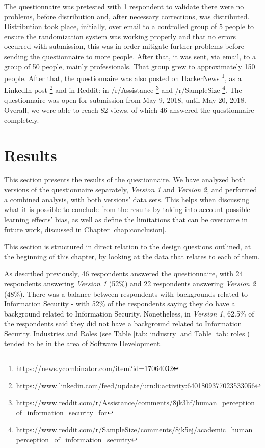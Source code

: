 The questionnaire was pretested with 1 respondent to validate there were no problems, before distribution and, after necessary corrections, was distributed. Distribution took place, initially, over email to a controlled group of 5 people to ensure the randomization system was working properly and that no errors occurred with submission, this was in order mitigate further problems before sending the questionnaire to more people. After that, it was sent, via email, to a group of 50 people, mainly professionals. That group grew to approximately 150 people. After that, the questionnaire was also posted on HackerNews \footnote{https://news.ycombinator.com/item?id=17064032}, as a LinkedIn post \footnote{https://www.linkedin.com/feed/update/urn:li:activity:6401809377023533056} and in Reddit: in /r/Assistance \footnote{https://www.reddit.com/r/Assistance/comments/8jk3hf/human\_perception\_of\_information\_security\_for} and /r/SampleSize  \footnote{https://www.reddit.com/r/SampleSize/comments/8jk5ej/academic\_human\_perception\_of\_information\_security}. The questionnaire was open for submission from May 9, 2018, until May 20, 2018. Overall, we were able to reach 82 views, of which 46 answered the questionnaire completely.

\section{Results}


This section presents the results of the questionnaire. We have analyzed both versions of the questionnaire separately, \textit{Version 1} and \textit{Version 2}, and performed a combined analysis, with both versions' data sets. This helps when discussing what it is possible to conclude from the results by taking into account possible learning effects' bias, as well as define the limitations that can be overcome in future work, discussed in Chapter \ref{chap:conclusion}.

This section is structured in direct relation to the design questions outlined, at the beginning of this chapter, by looking at the data that relates to each of them.

As described previously, 46 respondents answered the questionnaire, with 24 respondents answering \textit{Version 1} (52\%) and 22 respondents answering \textit{Version 2} (48\%). There was a balance between respondents with backgrounds related to Information Security - with 52\% of the respondents saying they do have a background related to Information Security. Nonetheless, in \textit{Version 1}, 62.5\% of the respondents said they did not have a background related to Information Security. Industries and Roles (see Table \ref{tab: industry} and Table \ref{tab: roles}) tended to be in the area of Software Development.

